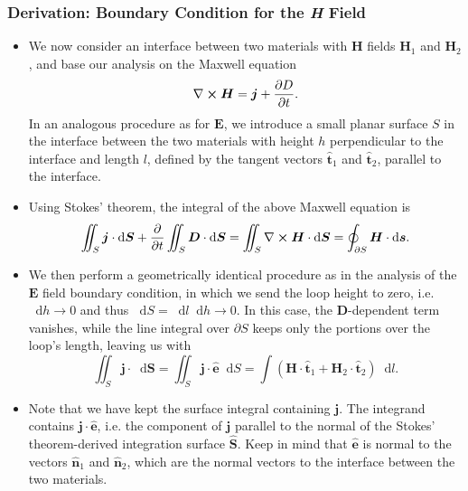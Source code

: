 \documentclass[11pt, a4paper]{article}
\newcommand{\diff}{\mathop{}\!\mathrm{d}} %
\renewcommand{\vec}[1]{\bm{#1}} %
\newcommand{\uvec}[1]{\hat{\vec{#1}}} %
\newcommand{\E}{\vec{E}} %
\newcommand{\D}{\vec{D}}  %
\renewcommand{\H}{\vec{H}}  %
\renewcommand{\j}{\vec{j}}  %
\renewcommand{\curl}{\nabla \cross}
\begin{document}
\subsubsection{Derivation: Boundary Condition for the \textit{H} Field}
\begin{itemize}
	\item We now consider an interface between two materials with $ \H $ fields $ \H_{1} $ and $ \H_{2} $, and base our analysis on the Maxwell equation
	\begin{equation*}
		\curl \H = \j + \pdv{D}{t}.
	\end{equation*}
	In an analogous procedure as for $ \E $, we introduce a small planar surface $ S $ in the interface between the two materials with height $ h $ perpendicular to the interface and length $ l $, defined by the tangent vectors $ \uvec{t}_{1} $ and $ \uvec{t}_{2} $, parallel to the interface.
	
	\item Using Stokes' theorem, the integral of the above Maxwell equation is
    \begin{equation*}
        \iint_{S} \j \cdot \diff \vec{S} + \pdv{t} \iint_{S} \D \cdot \diff \vec{S} = \iint_{S} \curl \H \cdot \diff \vec{S} = \oint_{\partial S} \H \cdot \diff \vec{s}.
	\end{equation*}

    \item We then perform a geometrically identical procedure as in the analysis of the $ \E $ field boundary condition, in which we send the loop height to zero, i.e. $ \diff h \to 0 $ and thus $ \diff S = \diff l \diff h \to 0 $. In this case, the $ \D $-dependent term vanishes, while the line integral over $ \partial S $ keeps only the portions over the loop's length, leaving us with
	\begin{equation*}
        \iint_{S} \j \cdot \diff \vec{S} = \iint_{S} \j \cdot \uvec{e} \diff S = \int (\H \cdot \uvec{t}_{1} + \H_{2}\cdot \uvec{t}_{2}) \diff l.
	\end{equation*}
    
    \item Note that we have kept the surface integral containing $ \j $. The integrand contains $ \j \cdot \uvec{e} $, i.e. the component of $ \j $ parallel to the normal of the Stokes' theorem-derived integration surface $ \uvec{S} $. Keep in mind that $ \uvec{e} $ is normal to the vectors $ \uvec{n}_{1} $ and $ \uvec{n}_{2} $, which are the normal vectors to the interface between the two materials.


\end{itemize}
\end{document}
